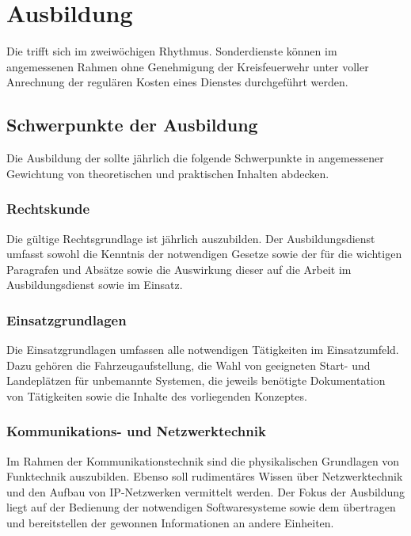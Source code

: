 \section{Ausbildung}

Die \callee{} trifft sich im zweiwöchigen Rhythmus. Sonderdienste können im angemessenen Rahmen ohne Genehmigung der Kreisfeuerwehr unter voller Anrechnung der regulären Kosten eines Dienstes durchgeführt werden.

\subsection{Schwerpunkte der Ausbildung}

Die Ausbildung der \callee{} sollte jährlich die folgende Schwerpunkte in angemessener Gewichtung von theoretischen und praktischen Inhalten abdecken.

\subsubsection{Rechtskunde}

Die gültige Rechtsgrundlage ist jährlich auszubilden. Der Ausbildungsdienst umfasst sowohl die Kenntnis der notwendigen Gesetze sowie der für die \callee{} wichtigen Paragrafen und Absätze sowie die Auswirkung dieser auf die Arbeit im Ausbildungsdienst sowie im Einsatz.\\

\subsubsection{Einsatzgrundlagen}

Die Einsatzgrundlagen umfassen alle notwendigen Tätigkeiten im Einsatzumfeld. Dazu gehören die Fahrzeugaufstellung, die Wahl von geeigneten Start- und Landeplätzen für unbemannte Systemen, die jeweils benötigte Dokumentation von Tätigkeiten sowie die Inhalte des vorliegenden Konzeptes.

\subsubsection{Kommunikations- und Netzwerktechnik}

Im Rahmen der Kommunikationstechnik sind die physikalischen Grundlagen von Funktechnik auszubilden. Ebenso soll rudimentäres Wissen über Netzwerktechnik und den Aufbau von IP-Netzwerken vermittelt werden. Der Fokus der Ausbildung liegt auf der Bedienung der notwendigen Softwaresysteme sowie dem übertragen und bereitstellen der gewonnen Informationen an andere Einheiten.

